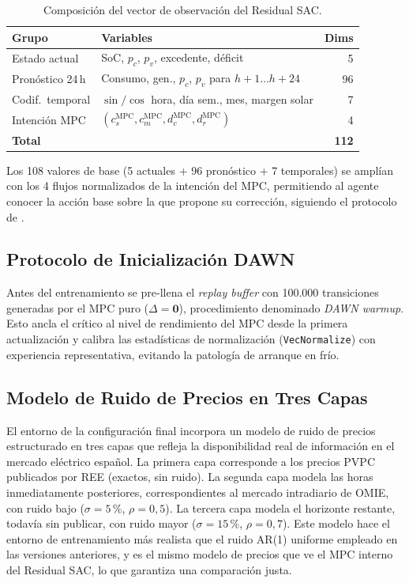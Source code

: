 \documentclass[12pt, a4paper, twoside]{report}
\begin{document}
\begin{table}[H]
\centering
\caption{Composición del vector de observación del Residual SAC.}
\label{tab:obs}
\begin{tabular}{llr}
\toprule
\textbf{Grupo} & \textbf{Variables} & \textbf{Dims} \\
\midrule
Estado actual & SoC, $p_c$, $p_v$, excedente, déficit & 5 \\
Pronóstico 24\,h & Consumo, gen., $p_c$, $p_v$ para $h{+}1\ldots h{+}24$ & 96 \\
Codif.\ temporal & $\sin/\cos$ hora, día sem., mes, margen solar & 7 \\
Intención MPC & $(c_s^{\text{MPC}}, c_m^{\text{MPC}}, d_c^{\text{MPC}}, d_r^{\text{MPC}})$ & 4 \\
\midrule
\textbf{Total} & & \textbf{112} \\
\bottomrule
\end{tabular}
\end{table}

Los 108 valores de base (5 actuales + 96 pronóstico + 7 temporales) se amplían
con los 4 flujos normalizados de la intención del MPC, permitiendo al agente
conocer la acción base sobre la que propone su corrección, siguiendo el
protocolo de \citet{Johannink2019}.

\subsection{Protocolo de Inicialización DAWN}
\label{sub:dawn}

Antes del entrenamiento se pre-llena el \textit{replay buffer} con 100.000
transiciones generadas por el MPC puro ($\Delta = \mathbf{0}$), procedimiento
denominado \textit{DAWN warmup}. Esto ancla el crítico al nivel de rendimiento
del MPC desde la primera actualización y calibra las estadísticas de
normalización (\texttt{VecNormalize}) con experiencia representativa, evitando
la patología de arranque en frío.

\subsection{Modelo de Ruido de Precios en Tres Capas}
\label{sub:ruido}

El entorno de la configuración final incorpora un modelo de ruido de precios
estructurado en tres capas que refleja la disponibilidad real de información en
el mercado eléctrico español. La primera capa corresponde a los precios PVPC
publicados por REE (exactos, sin ruido). La segunda capa modela las horas
inmediatamente posteriores, correspondientes al mercado intradiario de OMIE,
con ruido bajo ($\sigma=5\,\%$, $\rho=0{,}5$). La tercera capa modela el
horizonte restante, todavía sin publicar, con ruido mayor ($\sigma=15\,\%$,
$\rho=0{,}7$). Este modelo hace el entorno de entrenamiento más realista que el
ruido AR(1) uniforme empleado en las versiones anteriores, y es el mismo modelo
de precios que ve el MPC interno del Residual SAC, lo que garantiza una
comparación justa.
\end{document}
